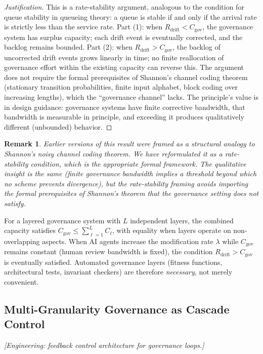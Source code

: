 \documentclass[11pt, a4paper, logo, copyright]{googledeepmind}
\newtheorem*{remark}{Remark}
\begin{document}
\begin{proof}[Justification]
This is a rate-stability argument, analogous to the condition for queue stability in queueing theory: a queue is stable if and only if the arrival rate is strictly less than the service rate. Part (1): when $R_{\text{drift}} < C_{\text{gov}}$, the governance system has surplus capacity; each drift event is eventually corrected, and the backlog remains bounded. Part (2): when $R_{\text{drift}} > C_{\text{gov}}$, the backlog of uncorrected drift events grows linearly in time; no finite reallocation of governance effort within the existing capacity can reverse this. The argument does not require the formal prerequisites of Shannon's channel coding theorem (stationary transition probabilities, finite input alphabet, block coding over increasing lengths), which the ``governance channel'' lacks. The principle's value is in design guidance: governance systems have finite corrective bandwidth, that bandwidth is measurable in principle, and exceeding it produces qualitatively different (unbounded) behavior.
\end{proof}

\begin{remark}
Earlier versions of this result were framed as a structural analogy to Shannon's noisy channel coding theorem. We have reformulated it as a rate-stability condition, which is the appropriate formal framework. The qualitative insight is the same (finite governance bandwidth implies a threshold beyond which no scheme prevents divergence), but the rate-stability framing avoids importing the formal prerequisites of Shannon's theorem that the governance setting does not satisfy.
\end{remark}

For a layered governance system with $L$ independent layers, the combined capacity satisfies $C_{\text{gov}} \leq \sum_{\ell=1}^{L} C_\ell$, with equality when layers operate on non-overlapping aspects. When AI agents increase the modification rate $\lambda$ while $C_{\text{gov}}$ remains constant (human review bandwidth is fixed), the condition $R_{\text{drift}} > C_{\text{gov}}$ is eventually satisfied. Automated governance layers (fitness functions, architectural tests, invariant checkers) are therefore \emph{necessary}, not merely convenient.

\subsection{Multi-Granularity Governance as Cascade Control}
\emph{[Engineering: feedback control architecture for governance loops.]}
\end{document}
